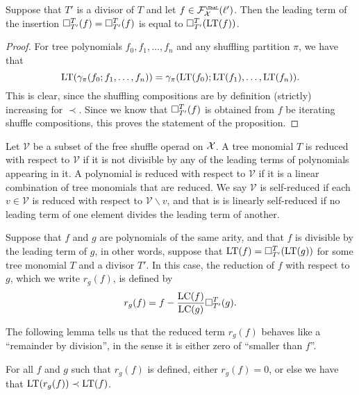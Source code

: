 		
\begin{proposition}\label{prop:repllead}
Suppose that $T'$ is a divisor of $T$ and let $f\in \FF_\XX^\Sha(\ell')$.
Then the leading term of the insertion $\square_{T'}^{T}(f) = \square_{T'}^T(f)$
is equal to $\square_{T'}^{T}(\operatorname{LT}(f))$.
\end{proposition}

\begin{proof}
For tree polynomials $f_0,f_1,\ldots,
f_n$ and any shuffling partition $\pi$, we have that
\[ \operatorname{LT}(\gamma_\pi(f_0;f_1,\ldots,f_n) )= 
 		\gamma_\pi(\operatorname{LT}(f_0);\operatorname{LT}(f_1),\ldots,\operatorname{LT}(f_n)).
 		\]
This is clear, since the shuffling compositions are by definition
(strictly) increasing for $\prec$. Since we know that $\square_{T'}^{T}(f)$
is obtained from $f$ be iterating shuffle compositions, this proves
the statement of the proposition. 
\end{proof}

Let $\mathcal{V}$ be a subset of the free shuffle operad on $\mathcal{X}$. A
tree monomial $T$ is reduced with respect to $\mathcal{V}$ if it is
not divisible by any of the leading terms of polynomials appearing in it.
A polynomial is reduced with respect to $\mathcal V$ if it is a linear
combination of tree monomials that are reduced. We say $\mathcal V$
is self-reduced if each $v\in \mathcal V$ is reduced with respect to
$\mathcal V\smallsetminus v$, and that is is linearly self-reduced
if no leading term of one element divides the leading term of 
another. 

\begin{definition}[Reduction]\label{def:reduce}
Suppose that $f$ and $g$ are polynomials of the same arity, and
that $f$ is divisible by the leading term of $g$, in other words,
suppose that $\operatorname{LT}(f) = \square_{T'}^{T}(\operatorname{LT}(g))$ for some
tree monomial $T$ and a divisor $T'$. In this case,
the reduction of $f$ with respect to $g$, which we write
$r_g(f)$, is defined by
\[
r_g(f) = f - \frac{\operatorname{LC}(f)}{\operatorname{LC}(g)} \square_{T'}^{T}(g).
\]
\end{definition}

The following lemma tells us that the reduced term $r_g(f)$ 
behaves like a ``remainder by division'', in the sense it is
either zero of ``smaller than $f$''.

\begin{lemma}\label{lemma:smaller}
For all $f$ and $g$ such that $r_g(f)$ is defined, either
$r_g(f)= 0$, or else we have that $\operatorname{LT}(r_g(f)) \prec \operatorname{LT}(f)$.
\end{lemma}

